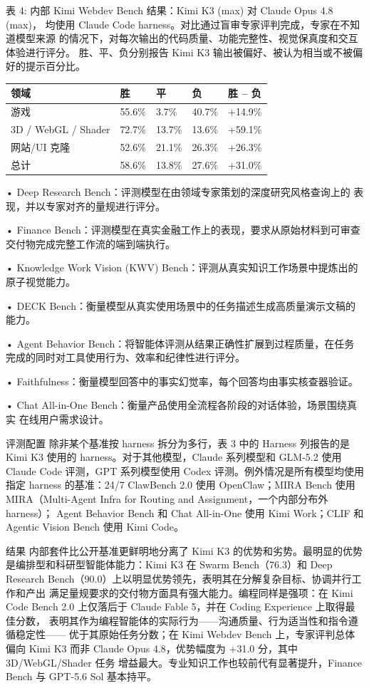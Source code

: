 表 4: 内部 Kimi Webdev Bench 结果：Kimi K3 (max) 对 Claude Opus 4.8 (max)，
均使用 Claude Code harness。对比通过盲审专家评判完成，专家在不知道模型来源
的情况下，对每次输出的代码质量、功能完整性、视觉保真度和交互体验进行评分。
胜、平、负分别报告 Kimi K3 输出被偏好、被认为相当或不被偏好的提示百分比。

{\def\LTcaptype{none} %
\begin{longtable}[]{@{}|l|l|l|l|l|@{}}
\toprule\noalign{}
\endhead
\bottomrule\noalign{}
\endlastfoot
\hline
领域 & 胜 & 平 & 负 & 胜 -- 负 \\
\hline
游戏 & 55.6\% & 3.7\% & 40.7\% & +14.9\% \\
\hline
3D / WebGL / Shader & 72.7\% & 13.7\% & 13.6\% & +59.1\% \\
\hline
网站/UI 克隆 & 52.6\% & 21.1\% & 26.3\% & +26.3\% \\
\hline
总计 & 58.6\% & 13.8\% & 27.6\% & +31.0\% \\
\hline
\end{longtable}
}

• Deep Research Bench：评测模型在由领域专家策划的深度研究风格查询上的
表现，并以专家对齐的量规进行评分。

• Finance Bench：评测模型在真实金融工作上的表现，要求从原始材料到可审查
交付物完成完整工作流的端到端执行。

• Knowledge Work Vision (KWV) Bench：评测从真实知识工作场景中提炼出的
原子视觉能力。

• DECK Bench：衡量模型从真实使用场景中的任务描述生成高质量演示文稿的
能力。

• Agent Behavior Bench：将智能体评测从结果正确性扩展到过程质量，在任务
完成的同时对工具使用行为、效率和纪律性进行评分。

• Faithfulness：衡量模型回答中的事实幻觉率，每个回答均由事实核查器验证。

• Chat All-in-One Bench：衡量产品使用全流程各阶段的对话体验，场景围绕真实
在线用户需求设计。

评测配置 除非某个基准按 harness 拆分为多行，表 3 中的 Harness 列报告的是
Kimi K3 使用的 harness。对于其他模型，Claude 系列模型和 GLM-5.2 使用
Claude Code 评测，GPT 系列模型使用 Codex 评测。例外情况是所有模型均使用
指定 harness 的基准：24/7 ClawBench 2.0 使用 OpenClaw；MIRA Bench 使用
MIRA（Multi-Agent Infra for Routing and Assignment，一个内部分布外 harness）；
Agent Behavior Bench 和 Chat All-in-One 使用 Kimi Work；CLIF 和 Agentic
Vision Bench 使用 Kimi Code。

结果 内部套件比公开基准更鲜明地分离了 Kimi K3 的优势和劣势。最明显的优势
是编排型和科研型智能体能力：Kimi K3 在 Swarm Bench（76.3）和 Deep Research
Bench（90.0）上以明显优势领先，表明其在分解复杂目标、协调并行工作和产出
满足量规要求的交付物方面具有强大能力。编程同样是强项：在 Kimi Code Bench
2.0 上仅落后于 Claude Fable 5，并在 Coding Experience 上取得最佳分数，
表明其作为编程智能体的实际行为——沟通质量、行为适当性和指令遵循稳定性——
优于其原始任务分数；在 Kimi Webdev Bench 上，专家评判总体偏向 Kimi K3
而非 Claude Opus 4.8，优势幅度为 +31.0 分，其中 3D/WebGL/Shader 任务
增益最大。专业知识工作也较前代有显著提升，Finance Bench 与 GPT-5.6 Sol
基本持平。

